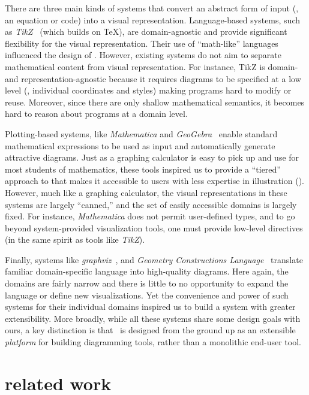 There are three main kinds of systems that convert an abstract form of input (\eg{}, an equation or code) into a visual representation.  Language-based systems, such as \textit{TikZ}~\cite{TikZ-Manual} (which builds on \TeX), are domain-agnostic and provide significant flexibility for the visual representation. Their use of ``math-like'' languages influenced the design of \Substance.  However, existing systems do not aim to separate mathematical content from visual representation. For instance, TikZ is domain- and representation-agnostic because it requires diagrams to be specified at a low level (\eg{}, individual coordinates and styles) making programs hard to modify or reuse.  Moreover, since there are only shallow mathematical semantics, it becomes hard to reason about programs at a domain level.

Plotting-based systems, like \emph{Mathematica} and \emph{GeoGebra}~\cite{Hohenwarter:2004:CDG} enable standard mathematical expressions to be used as input and automatically generate attractive diagrams.  Just as a graphing calculator is easy to pick up and use for most students of mathematics, these tools inspired us to provide a ``tiered'' approach to \Penrose{} that makes it accessible to users with less expertise in illustration (). However, much like a graphing calculator, the visual representations in these systems are largely ``canned,'' and the set of easily accessible domains is largely fixed.  For instance, \emph{Mathematica} does not permit user-defined types, and to go beyond system-provided visualization tools, one must provide low-level directives (in the same spirit as tools like \textit{TikZ}).

Finally, systems like \emph{graphviz}~\cite{Graphviz}, and \emph{Geometry Constructions Language}~\cite{Janivcic:2006:GCLC} translate familiar domain-specific language into high-quality diagrams. Here again, the domains are fairly narrow and there is little to no opportunity to expand the language or define new visualizations.  Yet the convenience and power of such systems for their individual domains inspired us to build a system with greater extensibility. More broadly, while all these systems share some design goals with ours, a key distinction is that \Penrose\ is designed from the ground up as an extensible \emph{platform} for building diagramming tools, rather than a monolithic end-user tool.

\section{\Edgworth related work}
\label{sec:edgeworth-related}

